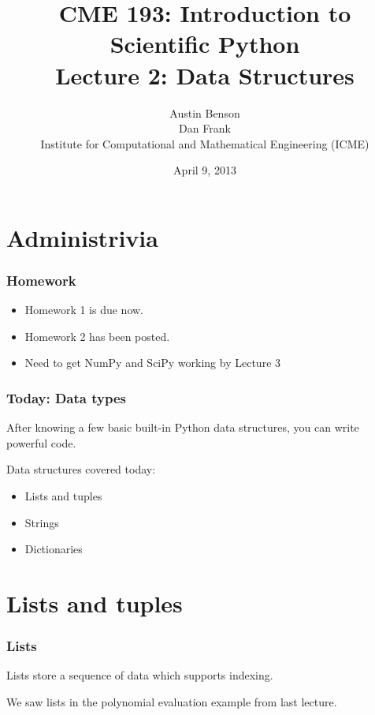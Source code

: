 \documentclass{beamer}
\title{CME 193: Introduction to Scientific Python \\
Lecture 2: Data Structures}
\author{Austin Benson \\
\vspace{0.1in}
Dan Frank \\
\vspace{0.1in}
Institute for Computational and Mathematical Engineering (ICME)}
\date{April 9, 2013}
\begin{document}
\maketitle

\section{Administrivia}
\begin{frame}
\frametitle{Homework}

\begin{itemize}
\setlength{\itemsep}{0.1in}
\item{Homework 1 is due now.}
\item{Homework 2 has been posted.}
\item{Need to get NumPy and SciPy working by Lecture 3}
\end{itemize}
\end{frame}


\begin{frame}
\frametitle{Today: Data types}

After knowing a few basic built-in Python data structures, you can write powerful code.

\vspace{0.1in}

Data structures covered today:
\begin{itemize}
\setlength{\itemsep}{0.1in}
\item{Lists and tuples}
\item{Strings}
\item{Dictionaries}
\end{itemize}

\end{frame}

\section{Lists and tuples}

\begin{frame}
\frametitle{Lists}

Lists store a sequence of data which supports indexing.

\vspace{0.1in}

We saw lists in the polynomial evaluation example from last lecture.

\end{frame}
\end{document}
